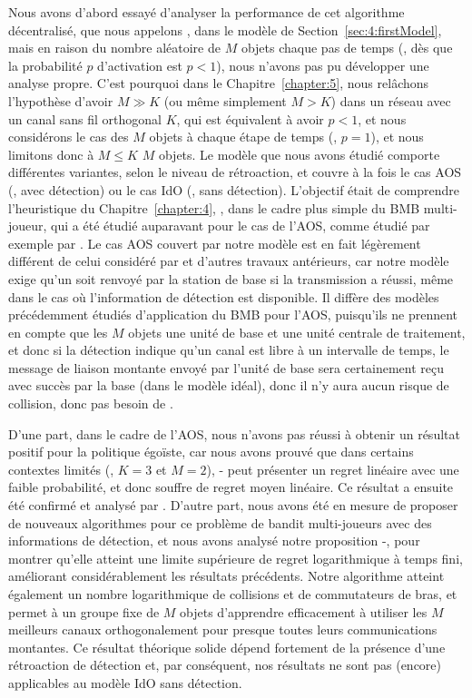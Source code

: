 \begin{resume_fr}
Nous avons d'abord essayé d'analyser la performance de cet algorithme décentralisé, que nous appelons \Selfish, dans le modèle de Section~\ref{sec:4:firstModel},
mais en raison du nombre aléatoire de $M$ objets chaque pas de temps (\ie, dès que la probabilité $p$ d'activation est $p < 1$), nous n'avons pas pu développer une analyse propre.
%
C'est pourquoi dans le Chapitre~\ref{chapter:5}, nous relâchons l'hypothèse d'avoir $M \gg K$ (ou même simplement $M > K$) dans un réseau avec un canal sans fil orthogonal $K$, qui est équivalent à avoir $p < 1$, et nous considérons le cas des $M$ objets à chaque étape de temps (\ie, $p=1$), et nous limitons donc à $M \leq K$ $M$ objets.
Le modèle que nous avons étudié comporte différentes variantes, selon le niveau de rétroaction, et couvre à la fois le cas AOS (\ie, avec détection) ou le cas IdO (\ie, sans détection).
L'objectif était de comprendre l'heuristique du Chapitre~\ref{chapter:4}, \Selfish, dans le cadre plus simple du BMB multi-joueur, qui a été étudié auparavant pour le cas de l'AOS, comme étudié par exemple par \cite{Zhao10,Anandkumar10,Anandkumar11}.
%
Le cas AOS couvert par notre modèle est en fait légèrement différent de celui considéré par \cite{Jouini10} et d'autres travaux antérieurs,
car notre modèle exige qu'un \Ack{} soit renvoyé par la station de base si la transmission a réussi, même dans le cas où l'information de détection est disponible.
Il diffère des modèles précédemment étudiés d'application du BMB pour l'AOS, puisqu'ils ne prennent en compte que les $M$ objets une unité de base et une unité centrale de traitement, et donc si la détection indique qu'un canal est libre à un intervalle de temps, le message de liaison montante envoyé par l'unité de base sera certainement reçu avec succès par la base (dans le modèle idéal), donc il n'y aura aucun risque de collision, donc pas besoin de \Ack.


D'une part, dans le cadre de l'AOS, nous n'avons pas réussi à obtenir un résultat positif pour la politique égoïste, car nous avons prouvé que dans certains contextes limités (\eg, $K=3$ et $M=2$), \Selfish-\UCB{} peut présenter un regret linéaire avec une faible probabilité, et donc souffre de regret moyen linéaire.
Ce résultat a ensuite été confirmé et analysé par \cite{BoursierPerchet18}.
%
D'autre part, nous avons été en mesure de proposer de nouveaux algorithmes pour ce problème de bandit multi-joueurs avec des informations de détection, et nous avons analysé notre proposition \MCTopM-\klUCB, pour montrer qu'elle atteint une limite supérieure de regret logarithmique à temps fini, améliorant considérablement les résultats précédents.
Notre algorithme atteint également un nombre logarithmique de collisions et de commutateurs de bras, et permet à un groupe fixe de $M$ objets d'apprendre efficacement à utiliser les $M$ meilleurs canaux orthogonalement pour presque toutes leurs communications montantes.
%
Ce résultat théorique solide dépend fortement de la présence d'une rétroaction de détection et, par conséquent, nos résultats ne sont pas (encore) applicables au modèle IdO sans détection.



\end{resume_fr}
